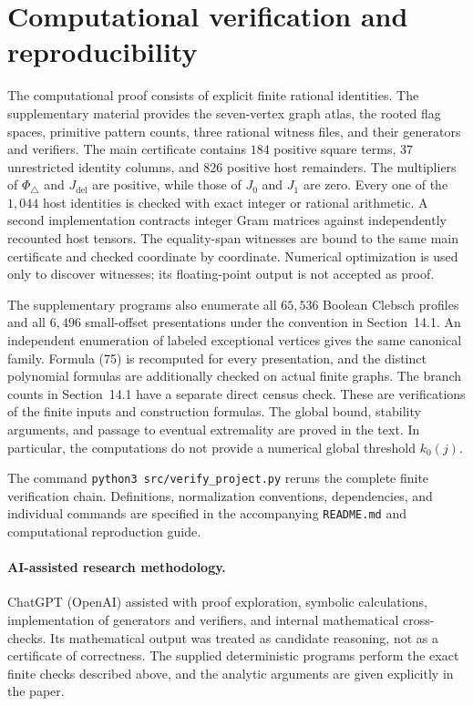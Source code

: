 \section*{Computational verification and reproducibility}

The computational proof consists of explicit finite rational identities.
The supplementary material provides the seven-vertex graph atlas, the
rooted flag spaces, primitive pattern counts, three rational witness
files, and their generators and verifiers. The main certificate contains
$184$ positive square terms, $37$ unrestricted identity columns, and
$826$ positive host remainders. The multipliers of $\Phi_\triangle$ and
$J_{\mathrm{del}}$ are positive, while those of $J_0$ and $J_1$ are zero.
Every one of the $1,044$ host identities is checked with exact integer or
rational arithmetic. A second implementation contracts integer Gram
matrices against independently recounted host tensors. The equality-span
witnesses are bound to the same main certificate and checked coordinate
by coordinate. Numerical optimization is used only to discover witnesses;
its floating-point output is not accepted as proof.

The supplementary programs also enumerate all $65,536$ Boolean Clebsch
profiles and all $6,496$ small-offset presentations under the convention
in Section~14.1. An independent enumeration of labeled exceptional
vertices gives the same canonical family. Formula (75) is recomputed for
every presentation, and the distinct polynomial formulas are additionally
checked on actual finite graphs. The branch counts in Section~14.1 have
a separate direct census check. These are verifications of the finite
inputs and construction formulas. The global bound, stability arguments,
and passage to eventual extremality are proved in the text. In
particular, the computations do not provide a numerical global threshold
$k_0(j)$.

The command \texttt{python3 src/verify\_project.py} reruns the complete
finite verification chain. Definitions, normalization conventions,
dependencies, and individual commands are specified in the accompanying
\texttt{README.md} and computational reproduction guide.

\paragraph{AI-assisted research methodology.}
ChatGPT (OpenAI) assisted with proof exploration, symbolic calculations,
implementation of generators and verifiers, and internal mathematical
cross-checks. Its mathematical output was treated as candidate reasoning,
not as a certificate of correctness. The supplied deterministic programs
perform the exact finite checks described above, and the analytic
arguments are given explicitly in the paper. 